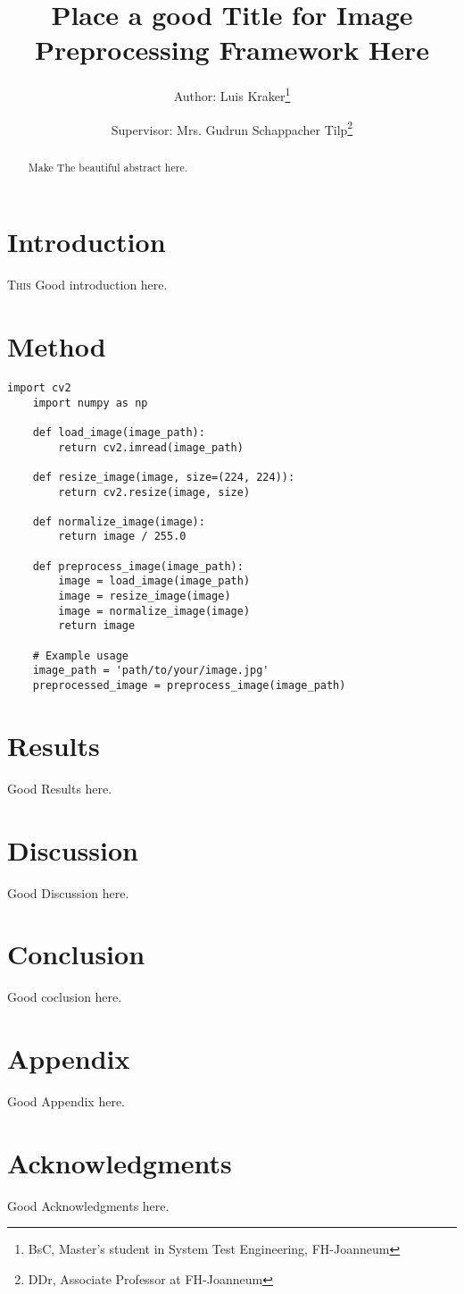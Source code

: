 \documentclass[journal ]{new-aiaa}
\title{Place a good Title for Image Preprocessing Framework Here}
\author{Author: Luis Kraker\footnote{BsC, Master's student in System Test Engineering, FH-Joanneum}}
\affil{FH-Joanneum, Graz 8020, Austria}
\author{Supervisor: Mrs. Gudrun Schappacher Tilp\footnote{DDr, Associate Professor at FH-Joanneum}}
\affil{FH-Joanneum, Graz 8020, Austria}
\begin{document}
\maketitle

\begin{abstract}
	Make The beautiful abstract here.
\end{abstract}



\section{Introduction}
\lettrine{T}{his} Good introduction here.


\section{Method}
    \begin{lstlisting}[caption={Python code for image preprocessing}, label=lst:imagepreprocessing]
    import cv2
    import numpy as np
    
    def load_image(image_path):
        return cv2.imread(image_path)
    
    def resize_image(image, size=(224, 224)):
        return cv2.resize(image, size)
    
    def normalize_image(image):
        return image / 255.0
    
    def preprocess_image(image_path):
        image = load_image(image_path)
        image = resize_image(image)
        image = normalize_image(image)
        return image
    
    # Example usage
    image_path = 'path/to/your/image.jpg'
    preprocessed_image = preprocess_image(image_path)
    \end{lstlisting}


\section{Results}
Good Results here.

\section{Discussion}
Good Discussion here.

\section{Conclusion}
Good coclusion here.

\section*{Appendix}

Good Appendix here.

\section*{Acknowledgments}
Good Acknowledgments here.


\end{document}
